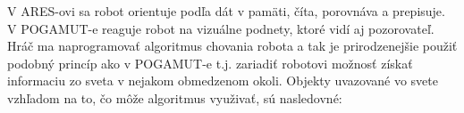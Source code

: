 V ARES-ovi sa robot orientuje podľa dát v pamäti, číta, porovnáva a prepisuje. V POGAMUT-e reaguje robot na vizuálne podnety, ktoré vidí aj pozorovateľ. Hráč ma naprogramovať algoritmus chovania robota a tak je prirodzenejšie použiť podobný princíp ako v POGAMUT-e t.j. zariadiť robotovi možnosť získať informaciu  zo sveta v nejakom obmedzenom okoli. %
Objekty uvazované vo svete vzhľadom na to, čo môže algoritmus využivať, sú nasledovné: %
